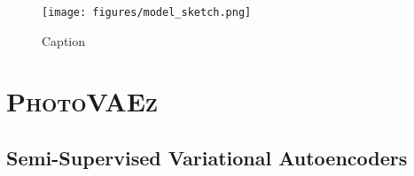 \begin{figure*}[t!]
    \centering
    \texttt{[image: figures/model\_sketch.png]}
    \caption{Caption}
    \label{fig:sketch}
\end{figure*}

\section{\textsc{PhotoVAEz}}
\label{sec:methods}





\subsection{Semi-Supervised Variational Autoencoders}
\label{subsec:ssvae}


